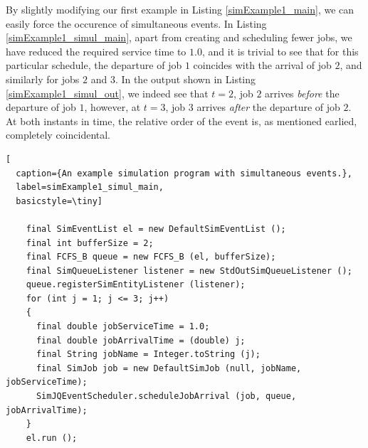 \documentclass[12pt]{book}
\begin{document}
By slightly modifying our first example in Listing \ref{simExample1_main},
  we can easily force the occurence of simultaneous events.
In Listing \ref{simExample1_simul_main},
  apart from creating and scheduling fewer jobs,
  we have reduced the required service time to $1.0$,
  and it is trivial to see that for this particular
  schedule, the departure of job $1$ coincides
  with the arrival of job $2$,
  and similarly for jobs $2$ and $3$.
In the output shown in Listing \ref{simExample1_simul_out},
  we indeed see that $t=2$,
  job $2$ arrives {\em before\/}
  the departure of job $1$,
  however,
  at $t=3$,
  job $3$ arrives {\em after\/}
  the departure of job $2$.
At both instants in time,
  the relative order of the event is,
  as mentioned earlied,
  completely coincidental.

\begin{lstfloat}
\begin{lstlisting}[
  caption={An example simulation program with simultaneous events.},
  label=simExample1_simul_main,
  basicstyle=\tiny]

    final SimEventList el = new DefaultSimEventList ();
    final int bufferSize = 2;
    final FCFS_B queue = new FCFS_B (el, bufferSize);
    final SimQueueListener listener = new StdOutSimQueueListener ();
    queue.registerSimEntityListener (listener);
    for (int j = 1; j <= 3; j++)
    {
      final double jobServiceTime = 1.0;
      final double jobArrivalTime = (double) j;
      final String jobName = Integer.toString (j);
      final SimJob job = new DefaultSimJob (null, jobName, jobServiceTime);
      SimJQEventScheduler.scheduleJobArrival (job, queue, jobArrivalTime);
    }
    el.run ();

\end{lstlisting}
\end{lstfloat}
\end{document}
